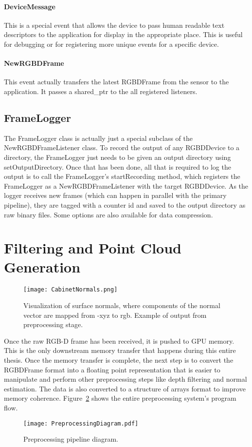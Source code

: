 \paragraph{DeviceMessage}
This is a special event that allows the device to pass human readable text descriptors to the application for display in the appropriate place. This is useful for debugging or for registering more unique events for a specific device.
\paragraph{NewRGBDFrame}
This event actually transfers the latest RGBDFrame from the sensor to the application. It passes a shared\_ptr to the all registered listeners.
\subsection{FrameLogger}
The FrameLogger class is actually just a special subclass of the NewRGBDFrameListener class. To record the output of any RGBDDevice to a directory, the FrameLogger just needs to be given an output directory using setOutputDirectory. Once that has been done, all that is required to log the output is to call the FrameLogger's startRecording method, which registers the FrameLogger as a NewRGBDFrameListener with the target RGBDDevice. As the logger receives new frames (which can happen in parallel with the primary pipeline), they are tagged with a counter id and saved to the output directory as raw binary files. Some options are also available for data compression.


\section{Filtering and Point Cloud Generation}
\begin{figure}[ht]
    \centering
    \texttt{[image: CabinetNormals.png]}
    \caption{Visualization of surface normals, where components of the normal vector are mapped from -xyz to rgb. Example of output from preprocessing stage. }
    \label{fig:filteringoutput}
\end{figure}
Once the raw RGB-D frame has been received, it is pushed to GPU memory. This is the only downstream memory transfer that happens during this entire thesis. Once the memory transfer is complete, the next step is to convert the RGBDFrame format into a floating point representation that is easier to manipulate and perform other preprocessing steps like depth filtering and normal estimation. The data is also converted to a structure of arrays format to improve memory coherence. Figure~\ref{fig:preprocessingdiagram} shows the entire preprocessing system's program flow. 
\begin{figure}[hp]
    \centering
    \texttt{[image: PreprocessingDiagram.pdf]}
    \caption{Preprocessing pipeline diagram.}
    \label{fig:preprocessingdiagram}
\end{figure}
